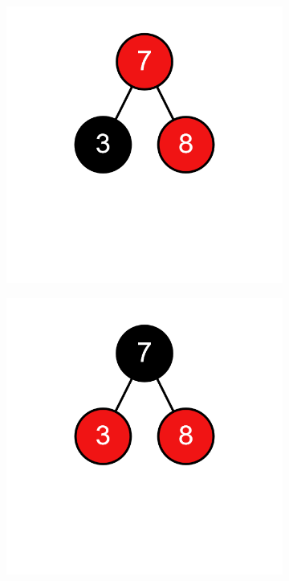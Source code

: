 \documentclass[11pt,a4paper]{article}
\begin{document}
\begin{loesung}
\begin{enumerate}[label=\alph*)]
\begin{enumerate}[label=\roman*)]
\begin{figure}[h!]
\begin{subfigure}[t]{0.15\textwidth}
                \end{subfigure}
                \begin{subfigure}[t]{0.15\textwidth}
                    \centering
                    \includegraphics[width=\textwidth]{img/2b/12}
                \end{subfigure}
                \begin{subfigure}[t]{0.15\textwidth}
                    \centering
                    \includegraphics[width=\textwidth]{img/2b/13}

\end{subfigure}
\end{figure}
\end{enumerate}
\end{enumerate}
\end{loesung}
\end{document}
